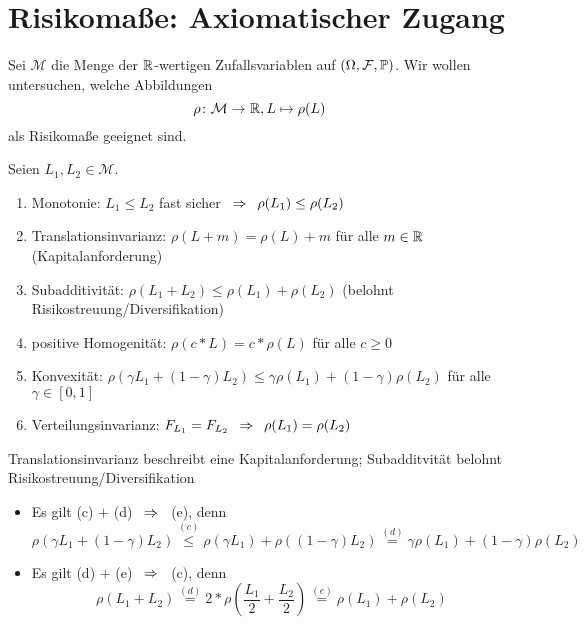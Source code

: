 \section{Risikomaße: Axiomatischer Zugang}

Sei $\mathcal{M}$ die Menge der $\mathbb{R}$-wertigen Zufallsvariablen auf $(\Omega, \mathcal{F}, \mathbb{P})$. Wir wollen untersuchen, welche Abbildungen 
\begin{equation*}
\abb{\rho}{\mathcal{M}}{\R}, L \mapsto \rho(L)
\end{equation*}
als Risikomaße geeignet sind.

\begin{*definition}
	Seien $L_1, L_2 \in \mathcal{M}$.
	\begin{enumerate}[label=(\alph*), nolistsep]
		\item Monotonie: $L_1 \le L_2$ fast sicher $\enskip \Rightarrow \enskip \rho(L_1) \le \rho(L_2)$
		\item Translationsinvarianz: $\rho(L + m) = \rho(L) + m$ für alle $m \in \mathbb{R}$ (Kapitalanforderung)
		\item Subadditivität: $\rho(L_1 + L_2) \le \rho(L_1) + \rho(L_2)$ (belohnt Risikostreuung/Diversifikation)
		\item positive Homogenität: $\rho(c * L) = c * \rho(L)$ für alle $c \ge 0$
		\item Konvexität: $\rho(\gamma L_1 + (1-\gamma) L_2) \le \gamma \rho(L_1) + (1-\gamma) \rho(L_2)$ für alle $\gamma \in [0,1]$
		\item Verteilungsinvarianz: $F_{L_1} = F_{L_2} \enskip \Rightarrow \enskip \rho(L_1) = \rho(L_2)$
	\end{enumerate}
\end{*definition}

\begin{*bemerkung_inline}
	Translationsinvarianz beschreibt eine Kapitalanforderung; Subadditvität belohnt Risikostreuung/Diversifikation
	\begin{itemize}[nolistsep]
		\item Es gilt (c) $+$ (d) $\enskip \Rightarrow \enskip$ (e), denn
		\begin{equation*}
		\rho(\gamma L_1 + (1-\gamma) L_2) \overset{(c)}{\le} \rho(\gamma L_1) + \rho((1-\gamma) L_2) \overset{(d)}{=} \gamma \rho(L_1) + (1-\gamma) \rho(L_2)
		\end{equation*}
		\item Es gilt (d) $+$ (e) $\enskip \Rightarrow \enskip$ (c), denn
		\begin{equation*}
		\rho(L_1 + L_2) \overset{(d)}{=} 2 * \rho(\frac{L_1}{2} + \frac{L_2}{2}) \overset{(e)}{=} \rho(L_1) + \rho(L_2)
		\end{equation*}
	\end{itemize}
\end{*bemerkung_inline}

